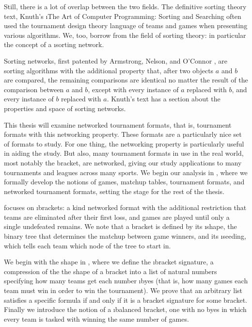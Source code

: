 {    Still, there is a lot of overlap between the two fields. The definitive sorting theory text, Knuth's \i{The Art of Computer Programming: Sorting and Searching} \cite{knuth} often used the tournament design theory language of teams and games when presenting various algorithms. We, too, borrow from the field of sorting theory: in particular the concept of a \i{sorting network}.

    Sorting networks, first patented by Armstrong, Nelson, and O'Connor \cite{pat}, are sorting algorithms with the additional property that, after two objects $a$ and $b$ are compared, the remaining comparisons are identical no matter the result of the comparison between $a$ and $b$, except with every instance of $a$ replaced with $b$, and every instance of $b$ replaced with $a$. Knuth's text has a section about the properties and space of sorting networks.

    This thesis will examine networked tournament formats, that is, tournament formats with this networking property. These formats are a particularly nice set of formats to study. For one thing, the networking property is particularly useful in aiding the study. But also, many tournament formats in use in the real world, most notably the bracket, are networked, giving our study applications to many tournaments and leagues across many sports. We begin our analysis in , where we formally develop the notions of games, matchup tables, tournament formats, and networked tournament formats, setting the stage for the rest of the thesis.
    
     focuses on \i{brackets}: a kind networked format with the additional restriction that teams are eliminated after their first loss, and games are played until only a single undefeated remains. We note that a bracket is defined by its \i{shape}, the binary tree that determines the matchup between game winners, and its \i{seeding}, which tells each team which node of the tree to start in.

    We begin with the shape in , where we define the \i{bracket signature}, a compression of the the shape of a bracket into a list of natural numbers specifying how many teams get each number \i{byes} (that is, how many games each team must win in order to win the tournament). We prove that an arbitrary list satisfies a specific formula if and only if it is a bracket signature for some bracket. Finally we introduce the notion of a \i{balanced} bracket, one with no byes in which every team is tasked with winning the same number of games.

}
